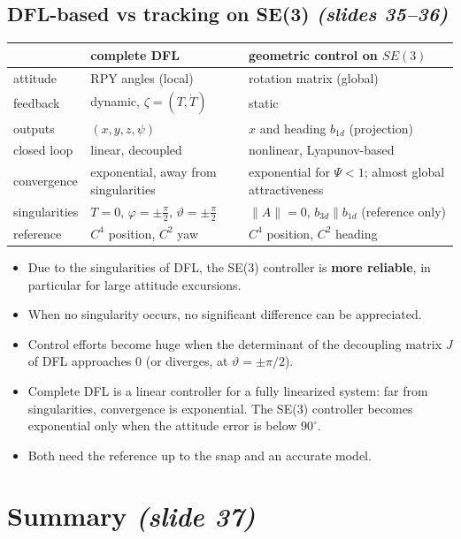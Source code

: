 \documentclass[11pt,a4paper]{article}
\newcommand{\sli}[1]{\emph{(#1)}}
\theoremstyle{definition}
\theoremstyle{plain}
\theoremstyle{remark}
\begin{document}
\subsection{DFL-based vs tracking on SE(3) \sli{slides 35--36}}

\begin{center}
\small
\begin{tabular}{p{2.6cm} p{4.6cm} p{5.6cm}}
\toprule
 & complete DFL & geometric control on $SE(3)$ \\
\midrule
attitude & RPY angles (local) & rotation matrix (global) \\
feedback & dynamic, $\zeta=(T,\dot T)$ & static \\
outputs & $(x,y,z,\psi)$ & $x$ and heading $b_{1d}$ (projection) \\
closed loop & linear, decoupled & nonlinear, Lyapunov-based \\
convergence & exponential, away from singularities & exponential for $\Psi<1$; almost global attractiveness \\
singularities & $T=0$, $\varphi=\pm\frac\pi2$, $\vartheta=\pm\frac\pi2$ & $\|A\|=0$, $b_{3d}\parallel b_{1d}$ (reference only) \\
reference & $C^4$ position, $C^2$ yaw & $C^4$ position, $C^2$ heading \\
\bottomrule
\end{tabular}
\end{center}

\begin{itemize}
  \item Due to the singularities of DFL, the SE(3) controller is \textbf{more reliable}, in particular for large attitude excursions.
  \item When no singularity occurs, no significant difference can be appreciated.
  \item Control efforts become huge when the determinant of the decoupling matrix $J$ of DFL approaches 0 (or diverges, at $\vartheta=\pm\pi/2$).
  \item Complete DFL is a linear controller for a fully linearized system: far from singularities, convergence is exponential. The SE(3) controller becomes exponential only when the attitude error is below $90^\circ$.
  \item Both need the reference up to the snap and an accurate model.
\end{itemize}

\section{Summary \sli{slide 37}}
\end{document}
